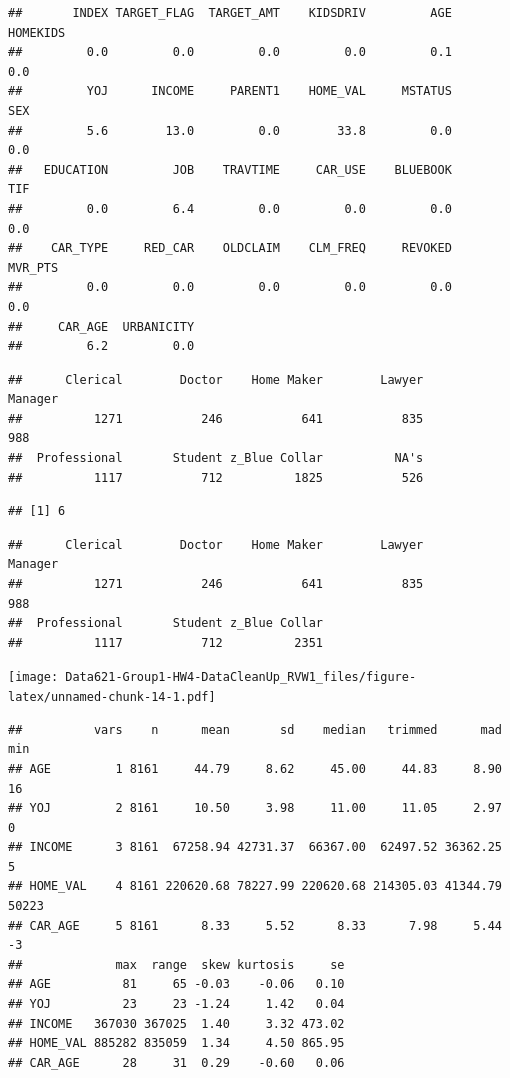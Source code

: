 \documentclass[]{article}
\begin{document}
\begin{verbatim}
##       INDEX TARGET_FLAG  TARGET_AMT    KIDSDRIV         AGE    HOMEKIDS 
##         0.0         0.0         0.0         0.0         0.1         0.0 
##         YOJ      INCOME     PARENT1    HOME_VAL     MSTATUS         SEX 
##         5.6        13.0         0.0        33.8         0.0         0.0 
##   EDUCATION         JOB    TRAVTIME     CAR_USE    BLUEBOOK         TIF 
##         0.0         6.4         0.0         0.0         0.0         0.0 
##    CAR_TYPE     RED_CAR    OLDCLAIM    CLM_FREQ     REVOKED     MVR_PTS 
##         0.0         0.0         0.0         0.0         0.0         0.0 
##     CAR_AGE  URBANICITY 
##         6.2         0.0
\end{verbatim}

\begin{verbatim}
##      Clerical        Doctor    Home Maker        Lawyer       Manager 
##          1271           246           641           835           988 
##  Professional       Student z_Blue Collar          NA's 
##          1117           712          1825           526
\end{verbatim}

\begin{verbatim}
## [1] 6
\end{verbatim}

\begin{verbatim}
##      Clerical        Doctor    Home Maker        Lawyer       Manager 
##          1271           246           641           835           988 
##  Professional       Student z_Blue Collar 
##          1117           712          2351
\end{verbatim}

\texttt{[image: Data621-Group1-HW4-DataCleanUp\_RVW1\_files/figure-latex/unnamed-chunk-14-1.pdf]}

\begin{verbatim}
##          vars    n      mean       sd    median   trimmed      mad   min
## AGE         1 8161     44.79     8.62     45.00     44.83     8.90    16
## YOJ         2 8161     10.50     3.98     11.00     11.05     2.97     0
## INCOME      3 8161  67258.94 42731.37  66367.00  62497.52 36362.25     5
## HOME_VAL    4 8161 220620.68 78227.99 220620.68 214305.03 41344.79 50223
## CAR_AGE     5 8161      8.33     5.52      8.33      7.98     5.44    -3
##             max  range  skew kurtosis     se
## AGE          81     65 -0.03    -0.06   0.10
## YOJ          23     23 -1.24     1.42   0.04
## INCOME   367030 367025  1.40     3.32 473.02
## HOME_VAL 885282 835059  1.34     4.50 865.95
## CAR_AGE      28     31  0.29    -0.60   0.06
\end{verbatim}
\end{document}
